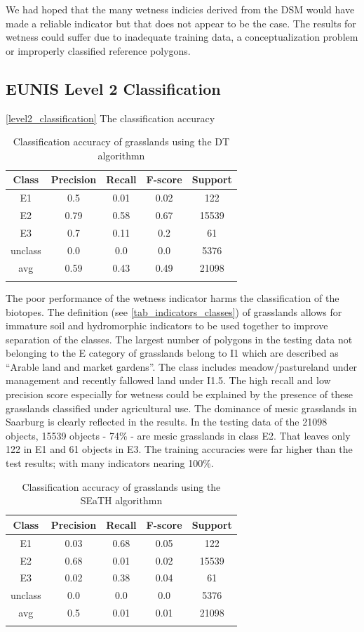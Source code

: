 \documentclass[authoryear, review,12pt,number]{elsarticle}
\begin{document}
We had hoped that the many wetness indicies derived from the DSM would have made
a reliable indicator but that does not appear to be the case. The results for
wetness could suffer due to inadequate training data, a conceptualization
problem or improperly classified reference polygons. 


\subsection{EUNIS Level 2 Classification}
\ref{level2_classification}
The classification accuracy
\begin{table}
\begin{tabular}{c c c c c}
Class & Precision & Recall & F-score & Support\\
\hline
E1 & 0.5 & 0.01 & 0.02 & 122\\
E2 & 0.79 & 0.58 & 0.67 & 15539\\
E3 & 0.7 & 0.11 & 0.2 & 61\\
unclass & 0.0 & 0.0 & 0.0 & 5376\\
avg & 0.59 & 0.43 & 0.49 & 21098\\
\label{fig_dt_lvl2_classification}
\end{tabular}
\caption{Classification accuracy of grasslands using the DT algorithmn}
\end{table}

The poor performance of the wetness indicator harms the classification of the
biotopes. The definition (see \ref{tab_indicators_classes}) of grasslands allows
for immature soil and hydromorphic indicators to be used together to improve
separation of the classes.
The largest number of polygons in the testing data not belonging to the E
category of grasslands belong to I1 which are described as ``Arable land and
market gardens''. The class includes meadow/pastureland under management and
recently fallowed land under I1.5. The high recall and low precision score
especially for wetness could be explained by the presence of these grasslands
classified under agricultural use.
The dominance of mesic grasslands in Saarburg is clearly reflected in
the results. In the testing data of the 21098 objects, 15539 objects - 74\% - are mesic grasslands
in class E2. That leaves only 122 in E1 and 61 objects in E3. The training
accuracies were far higher than the test results; with many indicators nearing
100\%.  



\begin{table}
\begin{tabular}{c c c c c}
Class & Precision & Recall & F-score & Support\\
\hline
E1 & 0.03 & 0.68 & 0.05 & 122\\
E2 & 0.68 & 0.01 & 0.02 & 15539\\
E3 & 0.02 & 0.38 & 0.04 & 61\\
unclass & 0.0 & 0.0 & 0.0 & 5376\\
avg & 0.5 & 0.01 & 0.01 & 21098\\
\label{fig_seath_lvl2_classification}
\end{tabular}
\caption{Classification accuracy of grasslands using the SEaTH algorithmn}
\end{table}
\end{document}
